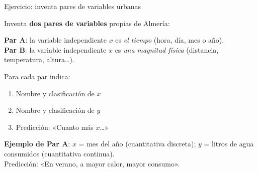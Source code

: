 \documentclass[aspectratio=169, 10pt, spanish]{beamer}
\begin{document}
\begin{frame}{Ejercicio: inventa pares de variables urbanas}
  \begin{aplicarbox}
    Inventa \textbf{dos pares de variables} propias de Almería:

    \vspace{0.2cm}
    \textbf{Par A}: la variable independiente \(x\) es \textit{el tiempo}
    (hora, día, mes o año).\\
    \textbf{Par B}: la variable independiente \(x\) es
    \textit{una magnitud física} (distancia, temperatura, altura\ldots).

    \vspace{0.2cm}
    Para cada par indica:
    \begin{enumerate}
      \item Nombre y clasificación de \(x\)
      \item Nombre y clasificación de \(y\)
      \item Predicción: «Cuanto más \(x\)\ldots»
    \end{enumerate}
  \end{aplicarbox}

  \vspace{0.2cm}
  \begin{ejemplobox}
    \AlmFontSmall
    \textbf{Ejemplo de Par A}: $x$ = mes del año (cuantitativa discreta);
    $y$ = litros de agua consumidos (cuantitativa continua).\\
    Predicción: «En verano, a mayor calor, mayor consumo».
  \end{ejemplobox}
\end{frame}
\end{document}
